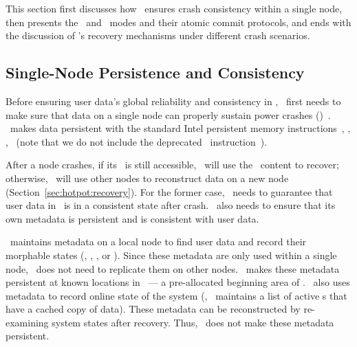This section first discusses how \hotpot\ ensures crash consistency within a single node,
then presents the \mrmw\ and \mrsw\ modes and their atomic commit protocols, %
and ends with the discussion of \hotpot's recovery mechanisms under different crash scenarios.

\subsection{Single-Node Persistence and Consistency}
\label{sec:hotpot:singleconsistency}

Before ensuring user data's global reliability and consistency in \dsnvm,
\hotpot\ first needs to make sure that data on a single node can properly sustain power crashes (\rcs)~\cite{Memory-Persistency}.
\hotpot\ makes data persistent with the standard Intel persistent memory instructions~\cite{Delegated-persist},
\ie, \clflush, \mfence\ (note that we do not include the deprecated \pcommit\ instruction~\cite{Deprecating-PCOMMIT}).

After a node crashes, if its \nvm\ is still accessible, \hotpot\ will use the \nvm\ content to recover;
otherwise, \hotpot\ will use other nodes to reconstruct data on a new node (Section~\ref{sec:hotpot:recovery}).
For the former case, \hotpot\ needs to guarantee that user data in \dsnvm\ is in a consistent state after crash.
\hotpot\ also needs to ensure that its own metadata is persistent and is consistent with user data.

\hotpot\ maintains metadata on a local node to find user data and record their morphable states (\ie, \committed, \dirty, or \redundant).
Since these metadata are only used within a single node, \hotpot\ does not need to replicate them on other nodes.
\hotpot\ makes these metadata persistent at known locations in \nvm\ ---
a pre-allocated beginning area of \nvm.
\hotpot\ also uses metadata to record online state of the system (\eg, \on\ maintains a list of active \dn{}s that have a cached copy of data).
These metadata can be reconstructed by re-examining system states after recovery.
Thus, \hotpot\ does not make these metadata persistent.



